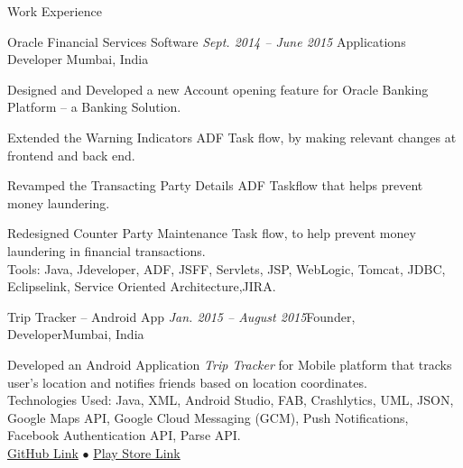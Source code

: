 \documentclass{resume} %
\begin{document}
\begin{rSection}{Work Experience}

\begin{rSubsection}{Oracle Financial Services Software} {\emph{Sept. 2014 -- June 2015}} {Applications Developer}
{Mumbai, India}

\item Designed and Developed a new Account opening feature for Oracle Banking Platform -- a Banking Solution.
\item Extended the Warning Indicators ADF Task flow, by making relevant changes at frontend and back end.
\item Revamped the Transacting Party Details ADF Taskflow that helps prevent money laundering.
\item Redesigned Counter Party Maintenance Task flow, to help prevent money laundering in financial transactions. \\
Tools: Java, Jdeveloper, ADF, JSFF, Servlets, JSP, WebLogic, Tomcat, JDBC, Eclipselink, Service Oriented Architecture,JIRA.

\end{rSubsection}


\begin{rSubsection}{Trip Tracker -- Android App}{\emph{ Jan. 2015 -- August 2015}}{Founder, Developer}{Mumbai, India}
\item Developed an Android Application {\emph{Trip Tracker}}  for Mobile platform that tracks user's  location and notifies friends based on location coordinates. \\
Technologies Used: Java, XML, Android Studio, FAB, Crashlytics, UML, JSON, Google Maps API, Google Cloud Messaging (GCM), Push Notifications, Facebook Authentication API, Parse API. \\
\href{https://github.com/sahil2441/Trip-Tracker}{GitHub Link}
{\tiny$\bullet$}
\href{https://play.google.com/store/apps/details?id=me.sahiljain.tripTracker}{Play Store Link}
\end{rSubsection}


\begin{comment}
\end{Huge}

\begin{rSubsection}{ASA \& Associates} {\emph{Summer 2011}}{Summer Intern}{New Delhi, India}
\item Performed an audit on Hewlett Packard's financial transactions to analyze cash flow and loss incurred in its transactions.
Tools: Excel, R.
\end{rSubsection}

\end{comment}

\end{rSection}
\end{document}
